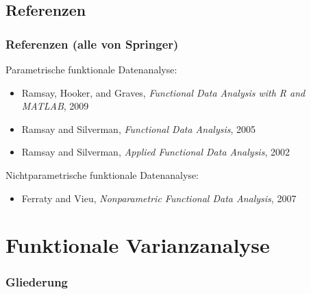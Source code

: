 \documentclass[xcolor=dvipsnames, compress, serif, professionalfont, handout]{beamer}
\begin{document}
%
%

\subsection{Referenzen}
\begin{frame}[fragile]
\frametitle{Referenzen (alle von Springer)}
  Parametrische funktionale Datenanalyse:  
  \begin{itemize}
    \item Ramsay, Hooker, and Graves, \textit{Functional Data Analysis
          with R and MATLAB}, 2009
    \item Ramsay and Silverman, \textit{Functional Data Analysis}, 2005
    \item Ramsay and Silverman, \textit{Applied Functional Data Analysis}, 
          2002
  \end{itemize}
  \pause Nichtparametrische funktionale Datenanalyse:
  \begin{itemize}
    \item Ferraty and Vieu, \textit{Nonparametric Functional Data Analysis}, 
          2007
  \end{itemize}
\end{frame}


%
%

\section{Funktionale Varianzanalyse}
\begin{frame}[fragile]
  \frametitle{Gliederung}
\end{frame}

%
%
\end{document}

